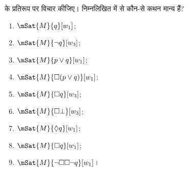 \documentclass[../../../include/open-logic-section]{subfiles}
\begin{document}
\begin{prob}
   के प्रतिरूप पर विचार कीजिए। निम्नलिखित
  में से कौन-से कथन मान्य हैं?
    \begin{enumerate}
    \item $\mSat{M}{q}[w_1]$;
    \item $\mSat{M}{\lnot q}[w_3]$;
    \item $\mSat{M}{p \lor q}[w_1]$;
    \item $\mSat{M}{\Box (p \lor q)}[w_1]$;
    \item $\mSat{M}{\Box q}[w_3]$;
    \item $\mSat{M}{\Box \bot}[w_3]$;
    \item $\mSat{M}{\Diamond q}[w_1]$;
    \item $\mSat{M}{\Box q}[w_1]$;
    \item $\mSat{M}{\lnot \Box\Box \lnot q}[w_1]$।
    \end{enumerate}
\end{prob}
\end{document}
